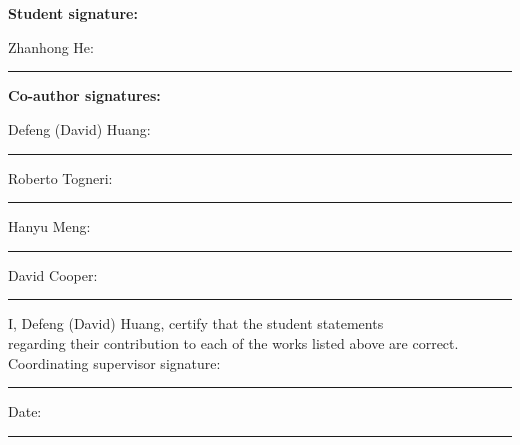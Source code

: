 \quad \\
\quad \\
\vskip 2cm

\noindent \textbf{Student signature:}
\vskip 0.3cm

\noindent Zhanhong He:
\vskip 0.5cm
\noindent \rule{0.6\textwidth}{0.4pt}

\vskip 0.8cm

\noindent \textbf{Co-author signatures:}
\vskip 0.3cm

\noindent Defeng (David) Huang:
\vskip 0.8cm
\noindent \rule{0.6\textwidth}{0.4pt}
\vskip 0.3cm

\noindent Roberto Togneri:
\vskip 0.8cm
\noindent \rule{0.6\textwidth}{0.4pt}
\vskip 0.3cm

\noindent Hanyu Meng:
\vskip 0.8cm
\noindent \rule{0.6\textwidth}{0.4pt}
\vskip 0.3cm

\noindent David Cooper:
\vskip 0.8cm
\noindent \rule{0.6\textwidth}{0.4pt}
\vskip 0.8cm

\noindent I, Defeng (David) Huang, certify that the student statements \\
regarding their contribution to each of the works listed above are correct.
\vskip 0.6cm
\noindent Coordinating supervisor signature:
\vskip 0.8cm
\noindent \rule{0.6\textwidth}{0.4pt}
\vskip 0.3cm
\noindent Date:
\vskip 0.8cm
\noindent \rule{0.32\textwidth}{0.4pt}
